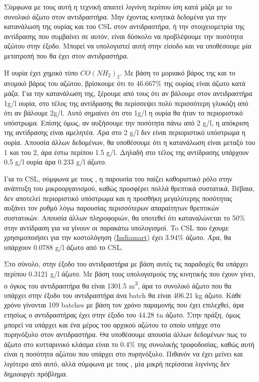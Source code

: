 \documentclass[11pt]{article}
\begin{document}
Σύμφωνα με τους \cite{wallersteinMethodRecoveringGlycerol1946} αυτή η τεχνική απαιτεί λιγνίνη περίπου ίση κατά μάζα με το συνολικό άζωτο στον αντιδραστήρα. Μην έχοντας κινητικά δεδομένα για την κατανάλωση της ουρίας και του CSL στον αντιδραστήρα, ή την στοιχειομετρία της αντίδρασης που συμβαίνει σε αυτόν, είναι δύσκολο να προβλέψουμε την ποσότητα αζώτου στην έξοδο. Μπορεί να υπολογιστεί αυτή στην είσοδο και να υποθέσουμε μία μετατροπή που θα έχει στον αντιδραστήρα.

Η ουρία έχει χημικό τύπο \(CO(NH_2)_2\). Με βάση το μοριακό βάρος της και το ατομικό βάρος του αζώτου, βρίσκουμε ότι το 46.667\% της ουρίας είναι άζωτο κατά μάζα. Για την κατανάλωση της, ξέρουμε από τους \cite{zhugeGlycerolProductionNovel2001} ότι αν βάλουμε στον αντιδραστήρα 1g/l ουρία, στο τέλος της αντίδρασης θα περίσσεψει πολύ περισσότερη γλυκόζη από ότι αν βάλουμε 2g/l. Αυτό σημαίνει ότι στο 1g/l η ουρία θα ήταν το περιοριστικό υπόστρωμα. Επίσης όμως, αν αυξήσουμε την ποσότητα πάνω από 2 g/l, η απόκριση της αντίδρασης είναι αμελητέα. Άρα στο 2 g/l δεν είναι περιοριστικό υπόστρωμα η ουρία. Απουσία άλλων δεδομένων, θα υποθέσουμε ότι η κατανάλωση είναι μεταξύ του 1 και του 2, άρα έστω περίπου 1.5 g/l. Δηλαδή στο τέλος της αντίδρασης υπάρχουν 0.5 g/l ουρία άρα 0.233 g/l άζωτο.

Για το CSL, σύμφωνα με τους \cite{zhugeGlycerolProductionNovel2001}, η παρουσία του παίζει καθοριστικό ρόλο στην ανάπτυξη του μικροοργανισμού, καθώς προσφέρει πολλά θρεπτικά συστατικά. Βέβαια, δεν αποτελεί περιοριστικό υπόστρωμα και η προσθήκη μεγαλύτερης ποσότητας αυξάνει τον ρυθμό λόγω παρουσίας περισσότερων απαραίτητων θρεπτικών συστατικών. Απουσία άλλων πληροφοριών, θα υποτεθεί ότι καταναλώνεται το 50\% στην αντίδραση για να γίνουν οι παρακάτω υπολογισμοί. To CSL που έχουμε χρησιμοποιήσει για την κοστολόγηση (\href{https://www.indiamart.com/proddetail/corn-steep-liquor-15744963191.html}{Indiamart}) έχει 3.94\% άζωτο. Άρα, θα υπάρχουν 0.0788 g/l άζωτο από το CSL.

Στο σύνολο, στην έξοδο του αντιδραστήρα με βάση αυτές τις παραδοχές θα υπάρχει περίπου 0.3121 g/l άζωτο. Με βάση τους υπολογισμούς της κινητικής που έχουν γίνει, ο όγκος του αντιδραστήρα θα είναι 1301.5 m\textsuperscript{3}, άρα το συνολικό άζωτο που θα υπάρχει στην έξοδο του αντιδραστήρα άνα batch θα είναι 406.21 kg άζωτο. Κάθε χρόνο γίνονται 109 batches με βάση τον χρόνο παραμονής που έχει επιλεχθεί, άρα ετησίως ο αντιδραστήρας έχει στην έξοδο του 44.28 tn άζωτο. Στην πράξη, όμως μπορεί να υπάρχει και ένα μέρος του αρχικού αζώτου το οποίο υπήρχε στο πυρηνόξυλο στον αντιδραστήρα. Θα υποθέσουμε απουσία άλλων δεδομένων πως το άζωτο στο κυτταρινικό κλάσμα είναι το 0.4\% της συνολικής τροφοδοσίας, καθώς αυτή είναι η ποσότητα αζώτου που υπάρχει στο πυρηνόξυλο. Πιθανόν να έχει μείνει και λιγότερο από αυτό, αλλά σύμφωνα με τους \cite{wallersteinMethodRecoveringGlycerol1946}, μία μικρή περίσσεια λιγνίνης δεν δημιουργέι πρόβλημα.
\end{document}
